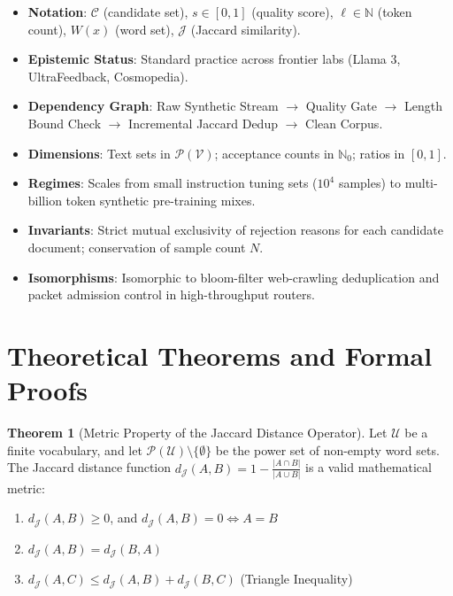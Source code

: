\documentclass[11pt,a4paper]{article}
\theoremstyle{definition}
\newtheorem{theorem}{\textbf{Theorem}}[section]
\begin{document}
\begin{itemize}
    \item \textbf{Notation}: $\mathcal{C}$ (candidate set), $s \in [0, 1]$ (quality score), $\ell \in \mathbb{N}$ (token count), $W(x)$ (word set), $\mathcal{J}$ (Jaccard similarity).
    \item \textbf{Epistemic Status}: Standard practice across frontier labs (Llama 3, UltraFeedback, Cosmopedia).
    \item \textbf{Dependency Graph}: Raw Synthetic Stream $\to$ Quality Gate $\to$ Length Bound Check $\to$ Incremental Jaccard Dedup $\to$ Clean Corpus.
    \item \textbf{Dimensions}: Text sets in $\mathcal{P}(\mathcal{V})$; acceptance counts in $\mathbb{N}_0$; ratios in $[0, 1]$.
    \item \textbf{Regimes}: Scales from small instruction tuning sets ($10^4$ samples) to multi-billion token synthetic pre-training mixes.
    \item \textbf{Invariants}: Strict mutual exclusivity of rejection reasons for each candidate document; conservation of sample count $N$.
    \item \textbf{Isomorphisms}: Isomorphic to bloom-filter web-crawling deduplication and packet admission control in high-throughput routers.
\end{itemize}

\section{Theoretical Theorems and Formal Proofs}

\begin{theorem}[Metric Property of the Jaccard Distance Operator]
Let $\mathcal{U}$ be a finite vocabulary, and let $\mathcal{P}(\mathcal{U}) \setminus \{\emptyset\}$ be the power set of non-empty word sets. The Jaccard distance function $d_{\mathcal{J}}(A, B) = 1 - \frac{|A \cap B|}{|A \cup B|}$ is a valid mathematical metric:
\begin{enumerate}
    \item $d_{\mathcal{J}}(A, B) \ge 0$, and $d_{\mathcal{J}}(A, B) = 0 \iff A = B$
    \item $d_{\mathcal{J}}(A, B) = d_{\mathcal{J}}(B, A)$
    \item $d_{\mathcal{J}}(A, C) \le d_{\mathcal{J}}(A, B) + d_{\mathcal{J}}(B, C)$ \quad (Triangle Inequality)
\end{enumerate}
\end{theorem}
\end{document}
